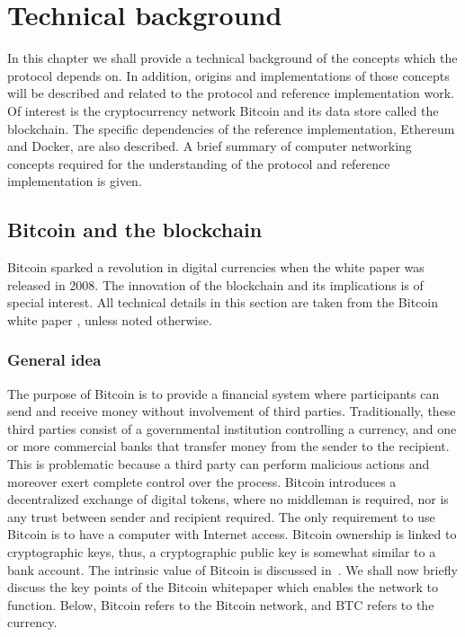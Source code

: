 \chapter{Technical background}
In this chapter we shall provide a technical background of the concepts which the protocol depends on. In addition, origins and implementations of those concepts will be described and related to the protocol and reference implementation work. Of interest is the cryptocurrency network Bitcoin and its data store called the blockchain. The specific dependencies of the reference implementation, Ethereum and Docker, are also described. A brief summary of computer networking concepts required for the understanding of the protocol and reference implementation is given.

\section{Bitcoin and the blockchain}
Bitcoin sparked a revolution in digital currencies when the white paper was released in 2008. The innovation of the blockchain and its implications is of special interest. All technical details in this section are taken from the Bitcoin white paper \cite{btc}, unless noted otherwise.

\subsection{General idea}
The purpose of Bitcoin is to provide a financial system where participants can send and receive money without involvement of third parties. Traditionally, these third parties consist of a governmental institution controlling a currency, and one or more commercial banks that transfer money from the sender to the recipient. This is problematic because a third party can perform malicious actions and moreover exert complete control over the process. Bitcoin introduces a decentralized exchange of digital tokens, where no middleman is required, nor is any trust between sender and recipient required. The only requirement to use Bitcoin is to have a computer with Internet access. Bitcoin ownership is linked to cryptographic keys, thus, a cryptographic public key is somewhat similar to a bank account. The intrinsic value of Bitcoin is discussed in~\cite{buterin:2011}. We shall now briefly discuss the key points of the Bitcoin whitepaper which enables the network to function. Below, Bitcoin refers to the Bitcoin network, and BTC refers to the currency.

